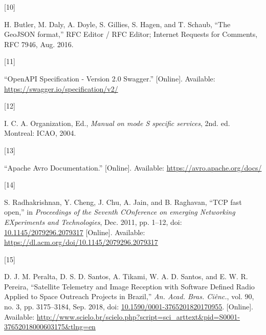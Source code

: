 \documentclass[
  letterpaper,
  a4paper,
  12pt,
  titlepage,
  oneside,
  openany]{book}
\newlength{\cslhangindent}
\newlength{\csllabelwidth}
\newlength{\cslentryspacingunit} %
\newenvironment{CSLReferences}[2] %
 {%
  \setlength{\parindent}{0pt}
  \ifodd #1
  \let\oldpar\par
  \def\par{\hangindent=\cslhangindent\oldpar}
  \fi
  \setlength{\parskip}{#2\cslentryspacingunit}
 }%
 {}
\newcommand{\CSLLeftMargin}[1]{\parbox[t]{\csllabelwidth}{#1}}
\newcommand{\CSLRightInline}[1]{\parbox[t]{\linewidth - \csllabelwidth}{#1}\break}
\begin{document}
\begin{CSLReferences}{0}{0}
\leavevmode{}%
\CSLLeftMargin{{[}10{]} }%
\CSLRightInline{H. Butler, M. Daly, A. Doyle, S. Gillies, S. Hagen, and
T. Schaub, {``The {GeoJSON} format,''} {RFC Editor / RFC Editor};
Internet Requests for Comments, RFC 7946, Aug. 2016. }

\leavevmode{}%
\CSLLeftMargin{{[}11{]} }%
\CSLRightInline{{``{OpenAPI Specification} - {Version} 2.0 \textbar{}
{Swagger}.''} {[}Online{]}. Available:
\url{https://swagger.io/specification/v2/}}

\leavevmode{}%
\CSLLeftMargin{{[}12{]} }%
\CSLRightInline{I. C. A. Organization, Ed., \emph{Manual on mode {S}
specific services}, 2nd. ed. {Montreal}: {ICAO}, 2004. }

\leavevmode{}%
\CSLLeftMargin{{[}13{]} }%
\CSLRightInline{{``Apache {Avro Documentation}.''} {[}Online{]}.
Available: \url{https://avro.apache.org/docs/}}

\leavevmode{}%
\CSLLeftMargin{{[}14{]} }%
\CSLRightInline{S. Radhakrishnan, Y. Cheng, J. Chu, A. Jain, and B.
Raghavan, {``{TCP} fast open,''} in \emph{Proceedings of the {Seventh
COnference} on emerging {Networking EXperiments} and {Technologies}},
Dec. 2011, pp. 1--12, doi:
\href{https://doi.org/10.1145/2079296.2079317}{10.1145/2079296.2079317}
{[}Online{]}. Available:
\url{https://dl.acm.org/doi/10.1145/2079296.2079317}}

\leavevmode{}%
\CSLLeftMargin{{[}15{]} }%
\CSLRightInline{D. J. M. Peralta, D. S. D. Santos, A. Tikami, W. A. D.
Santos, and E. W. R. Pereira, {``Satellite {Telemetry} and {Image
Reception} with {Software Defined Radio Applied} to {Space Outreach
Projects} in {Brazil},''} \emph{An. Acad. Bras. Ciênc.}, vol. 90, no. 3,
pp. 3175--3184, Sep. 2018, doi:
\href{https://doi.org/10.1590/0001-3765201820170955}{10.1590/0001-3765201820170955}.
{[}Online{]}. Available:
\url{http://www.scielo.br/scielo.php?script=sci_arttext\&pid=S0001-37652018000603175\&tlng=en}}

\end{CSLReferences}
\endgroup
\clearpage


\backmatter

\clearpage
\end{document}
